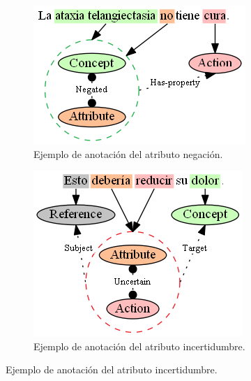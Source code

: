 \begin{figure}[H]
	\centering
	\begin{subfigure}{2.4in}
		\includegraphics[width=\textwidth]{graphics/annotation_example_attribute_negated.png}
		\caption{Ejemplo de anotación del atributo negación.}
		\vspace{0.3in}
		\label{fig:annotation_example_attribute_negated}
	\end{subfigure}
	\quad
	\begin{subfigure}{2.2in}
		\includegraphics[width=\linewidth]{graphics/annotation_example_attribute_uncertain.png}
		\caption{Ejemplo de anotación del atributo incertidumbre.}
		\vspace{0.3in}
		\label{fig:annotation_example_attribute_uncertain}
	\end{subfigure}

\end{figure}
